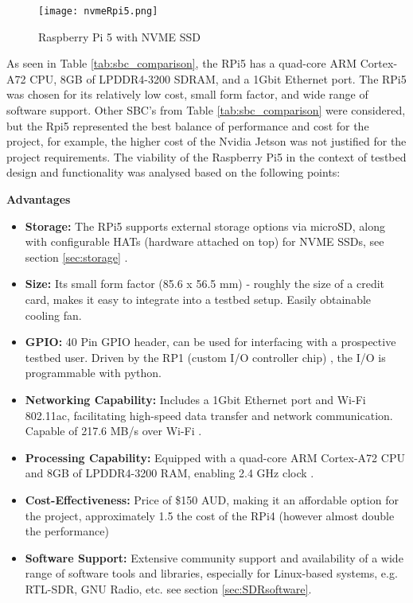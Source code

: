 \begin{figure}[htbp]
    \centering
    \texttt{[image: nvmeRpi5.png]}
    \caption{Raspberry Pi 5 with NVME SSD \cite{pimoroni_nvme_base}}
    \label{fig:Rpi5}
\end{figure}

As seen in Table \ref{tab:sbc_comparison}, the RPi5 has a quad-core ARM Cortex-A72 CPU, 8GB of LPDDR4-3200 SDRAM, and a 1Gbit Ethernet port. The RPi5 was chosen for its relatively low cost, small form factor, and wide range of software support. Other SBC's from Table \ref{tab:sbc_comparison} were considered, but the Rpi5 represented the best balance of performance and cost for the project, for example, the higher cost of the Nvidia Jetson was not justified for the project requirements. The viability of the Raspberry Pi5 in the context of testbed design and functionality was analysed based on the following points:

\noindent \textbf{Advantages}
\begin{itemize}
    \item \textbf{Storage:} The RPi5 supports external storage options via microSD, along with configurable HATs (hardware attached on top) for NVME SSDs, see section \ref{sec:storage} \cite{pimoroni_nvme_base}.
    \item \textbf{Size:} Its small form factor (85.6 x 56.5 mm) - roughly the size of a credit card, makes it easy to integrate into a testbed setup. Easily obtainable cooling fan.
    \item \textbf{GPIO:} 40 Pin GPIO header, can be used for interfacing with a prospective testbed user. Driven by the RP1 (custom I/O controller chip) \cite{core_electronics_rpi5}, the I/O is programmable with python.
    \item \textbf{Networking Capability:} Includes a 1Gbit Ethernet port and Wi-Fi 802.11ac, facilitating high-speed data transfer and network communication. Capable of 217.6 MB/s over Wi-Fi \cite{rpi5_wifi}.
    \item \textbf{Processing Capability:} Equipped with a quad-core ARM Cortex-A72 CPU and 8GB of LPDDR4-3200 RAM, enabling 2.4 GHz clock \cite{core_electronics_rpi5}.
    \item \textbf{Cost-Effectiveness:} Price of \$150 AUD, making it an affordable option for the project, approximately 1.5 the cost of the RPi4 (however almost double the performance) \cite{core_electronics_rpi5}
    \item \textbf{Software Support:} Extensive community support and availability of a wide range of software tools and libraries, especially for Linux-based systems, e.g. RTL-SDR, GNU Radio, etc. see section \ref{sec:SDRsoftware}.
\end{itemize}

